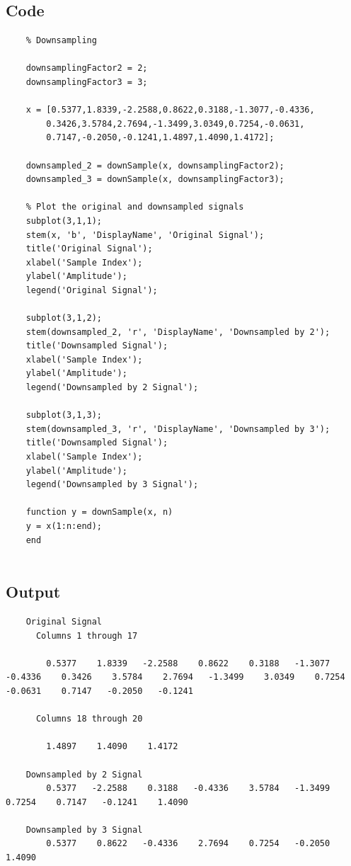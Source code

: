 \documentclass[a4paper,12pt]{article}
\begin{document}
\subsection*{Code}
\begin{lstlisting}
    % Downsampling

    downsamplingFactor2 = 2;
    downsamplingFactor3 = 3;
    
    x = [0.5377,1.8339,-2.2588,0.8622,0.3188,-1.3077,-0.4336,
        0.3426,3.5784,2.7694,-1.3499,3.0349,0.7254,-0.0631,
        0.7147,-0.2050,-0.1241,1.4897,1.4090,1.4172];
    
    downsampled_2 = downSample(x, downsamplingFactor2);
    downsampled_3 = downSample(x, downsamplingFactor3);
    
    % Plot the original and downsampled signals
    subplot(3,1,1);
    stem(x, 'b', 'DisplayName', 'Original Signal');
    title('Original Signal');
    xlabel('Sample Index');
    ylabel('Amplitude');
    legend('Original Signal');
    
    subplot(3,1,2);
    stem(downsampled_2, 'r', 'DisplayName', 'Downsampled by 2');
    title('Downsampled Signal');
    xlabel('Sample Index');
    ylabel('Amplitude');
    legend('Downsampled by 2 Signal');
    
    subplot(3,1,3);
    stem(downsampled_3, 'r', 'DisplayName', 'Downsampled by 3');
    title('Downsampled Signal');
    xlabel('Sample Index');
    ylabel('Amplitude');
    legend('Downsampled by 3 Signal');
    
    function y = downSample(x, n)
    y = x(1:n:end);
    end
    
\end{lstlisting}

\subsection*{Output}
\begin{lstlisting}
    Original Signal
      Columns 1 through 17

        0.5377    1.8339   -2.2588    0.8622    0.3188   -1.3077   -0.4336    0.3426    3.5784    2.7694   -1.3499    3.0349    0.7254   -0.0631    0.7147   -0.2050   -0.1241

      Columns 18 through 20

        1.4897    1.4090    1.4172

    Downsampled by 2 Signal
        0.5377   -2.2588    0.3188   -0.4336    3.5784   -1.3499    0.7254    0.7147   -0.1241    1.4090

    Downsampled by 3 Signal
        0.5377    0.8622   -0.4336    2.7694    0.7254   -0.2050    1.4090
\end{lstlisting}
\end{document}
